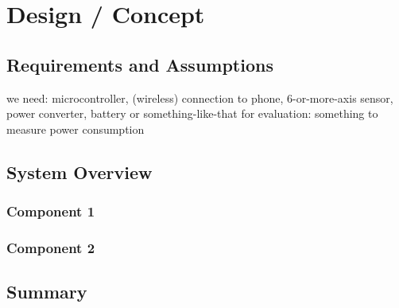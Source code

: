 \chapter{Design / Concept}
\label{ch:design}

\section{Requirements and Assumptions}
we need: microcontroller, (wireless) connection to phone, 6-or-more-axis sensor, power converter, battery or something-like-that
for evaluation: something to measure power consumption

\section{System Overview}

\subsection{Component 1}

\subsection{Component 2}

\section{Summary}